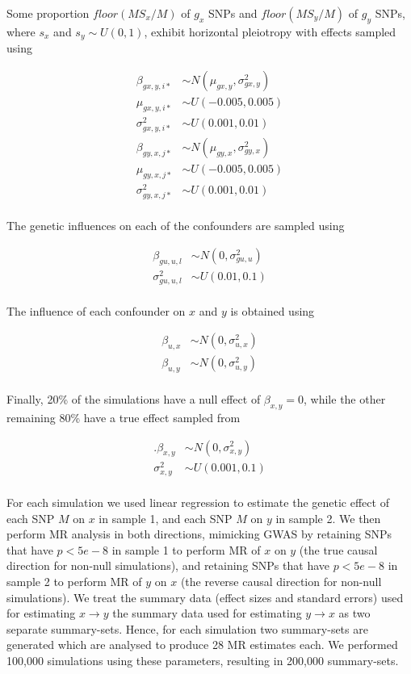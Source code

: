 \documentclass[]{article}
\begin{document}
Some proportion \(floor(MS_{x}/M)\) of \(g_x\) SNPs and
\(floor(MS_{y}/M)\) of \(g_y\) SNPs, where \(s_x\) and
\(s_y \sim U(0,1)\), exhibit horizontal pleiotropy with effects sampled
using

\[
\begin{aligned}
\beta_{gx,y,i*} & \sim N(\mu_{gx,y}, \sigma^2_{gx,y})  \\
\mu_{gx,y,i*} & \sim U(-0.005, 0.005) \\
\sigma^2_{gx,y,i*} & \sim U(0.001, 0.01) \\
\beta_{gy,x,j*} & \sim N(\mu_{gy,x}, \sigma^2_{gy,x}) \\
\mu_{gy,x,j*} & \sim U(-0.005, 0.005) \\
\sigma^2_{gy,x,j*} & \sim U(0.001, 0.01) \\
\end{aligned}
\]

The genetic influences on each of the confounders are sampled using

\[
\begin{aligned}
\beta_{gu,u,l} & \sim N(0, \sigma^2_{gu,u}) \\
\sigma^2_{gu,u,l} & \sim U(0.01, 0.1) \\
\end{aligned}
\]

The influence of each confounder on \(x\) and \(y\) is obtained using

\[
\begin{aligned}
\beta_{u,x} & \sim N(0, \sigma^{2}_{u,x}) \\
\beta_{u,y} & \sim N(0, \sigma^{2}_{u,y}) \\
\end{aligned}
\]

Finally, 20\% of the simulations have a null effect of
\(\beta_{x,y} = 0\), while the other remaining 80\% have a true effect
sampled from

\[
\begin{aligned}.
\beta_{x,y} & \sim N(0, \sigma^2_{x,y}) \\
\sigma^2_{x,y} & \sim U(0.001, 0.1) \\
\end{aligned}
\]

For each simulation we used linear regression to estimate the genetic
effect of each SNP \(M\) on \(x\) in sample 1, and each SNP \(M\) on
\(y\) in sample 2. We then perform MR analysis in both directions,
mimicking GWAS by retaining SNPs that have \(p < 5e-8\) in sample 1 to
perform MR of \(x\) on \(y\) (the true causal direction for non-null
simulations), and retaining SNPs that have \(p < 5e-8\) in sample 2 to
perform MR of \(y\) on \(x\) (the reverse causal direction for non-null
simulations). We treat the summary data (effect sizes and standard
errors) used for estimating \(x \rightarrow y\) the summary data used
for estimating \(y \rightarrow x\) as two separate summary-sets. Hence,
for each simulation two summary-sets are generated which are analysed to
produce 28 MR estimates each. We performed 100,000 simulations using
these parameters, resulting in 200,000 summary-sets.
\end{document}
